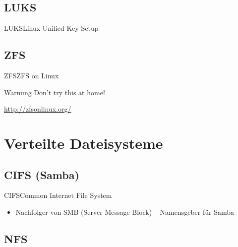 \documentclass[pdflatex, ngerman]{beamer}
\begin{document}
\subsection{LUKS}

\begin{frame}{LUKS}{Linux Unified Key Setup}

\end{frame}

\subsection{ZFS}

\begin{frame}{ZFS}{ZFS on Linux}


\begin{alertblock}{Warnung}
	Don't try this at home!
\end{alertblock}

\begin{block}{}
	\url{http://zfsonlinux.org/}
\end{block}

\end{frame}

\section{Verteilte Dateisysteme}

\subsection{CIFS (Samba)}

\begin{frame}{CIFS}{Common Internet File System}

\begin{block}{}
  \begin{itemize}
    \item Nachfolger von SMB (Server Message Block) -- Namensgeber für Samba
  \end{itemize}
\end{block}

\end{frame}

\subsection{NFS}
\end{document}
